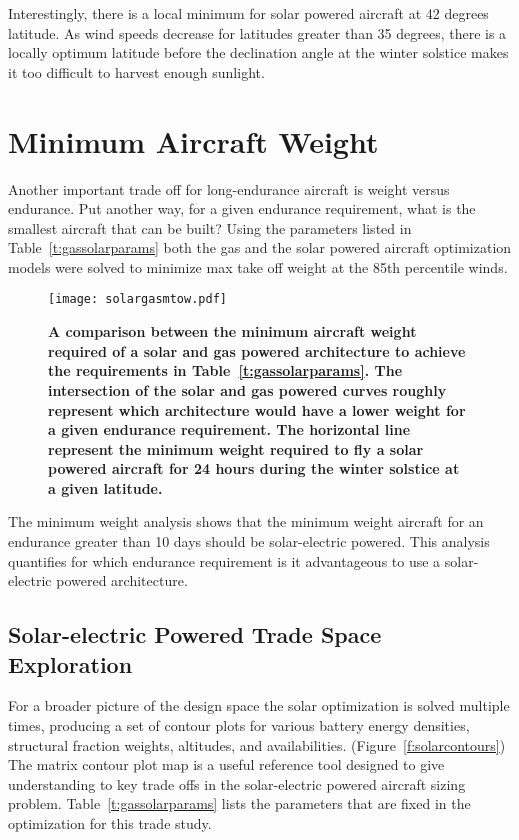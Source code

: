\documentclass[]{aiaa-tc}%
\begin{document}
Interestingly, there is a local minimum for solar powered aircraft at 42 degrees latitude.  As wind speeds decrease for latitudes greater than 35 degrees, there is a locally optimum latitude before the declination angle at the winter solstice makes it too difficult to harvest enough sunlight.

\section{Minimum Aircraft Weight}

Another important trade off for long-endurance aircraft is weight versus endurance. 
Put another way, for a given endurance requirement, what is the smallest aircraft that can be built?
Using the parameters listed in Table~\ref{t:gassolarparams} both the gas and the solar powered aircraft optimization models were solved to minimize max take off weight at the 85th percentile winds.  

\begin{figure}[H]
	\begin{center}
	\texttt{[image: solargasmtow.pdf]}
    \caption{ \textbf{ A comparison between the minimum aircraft weight required of a solar and gas powered architecture to achieve the requirements in Table~\ref{t:gassolarparams}. The intersection of the solar and gas powered curves roughly represent which architecture would have a lower weight for a given endurance requirement. The horizontal line represent the minimum weight required to fly a solar powered aircraft for 24 hours during the winter solstice at a given latitude.}}
	\label{f:solargasmtow}
	\end{center}
\end{figure}

The minimum weight analysis shows that the minimum weight aircraft for an endurance greater than 10 days should be solar-electric powered.  This analysis quantifies for which endurance requirement is it advantageous to use a solar-electric powered architecture.

\subsection{Solar-electric Powered Trade Space Exploration}

For a broader picture of the design space the solar optimization is solved multiple times, producing a set of contour plots for various battery energy densities, structural fraction weights, altitudes, and availabilities.  (Figure~\ref{f:solarcontours}) 
The matrix contour plot map is a useful reference tool designed to give understanding to key trade offs in the solar-electric powered aircraft sizing problem.
Table~\ref{t:gassolarparams} lists the parameters that are fixed in the optimization for this trade study.
\end{document}

